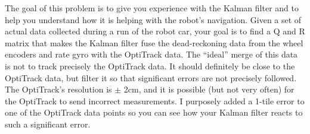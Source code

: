\documentclass[11pt]{article}
\begin{document}
The goal of this problem is to give you experience with the Kalman filter and to help you understand how it is helping with the robot’s navigation. Given a set of actual data collected during a run of the robot car, your goal is to find a Q and R matrix that makes the Kalman filter fuse the dead-reckoning data from the wheel encoders and rate gyro with the OptiTrack data. The “ideal” merge of this data is not to track precisely the OptiTrack data. It should definitely be close to the OptiTrack data, but filter it so that significant errors are not precisely followed. The OptiTrack’s resolution is $\pm$ 2cm, and it is possible (but not very often) for the OptiTrack to send incorrect measurements. I purposely added a 1-tile error to one of the OptiTrack data points so you can see how your Kalman filter reacts to such a significant error.
\end{document}
